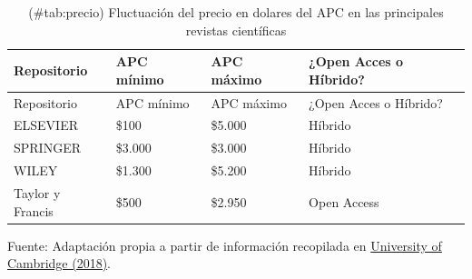 \documentclass[
  spanish,
  letterpaper,
  DIV=11,
  numbers=noendperiod]{scrreprt}
\begin{document}
\begin{longtable}[]{@{}
  >{\raggedright\arraybackslash}p{}
  >{\raggedright\arraybackslash}p{}
  >{\raggedright\arraybackslash}p{}
  >{\raggedright\arraybackslash}p{}@{}}
\caption{(\#tab:precio) Fluctuación del precio en dolares del APC en las
principales revistas científicas}\tabularnewline
\toprule\noalign{}
\begin{minipage}[b]{\linewidth}\raggedright
Repositorio
\end{minipage} & \begin{minipage}[b]{\linewidth}\raggedright
APC mínimo
\end{minipage} & \begin{minipage}[b]{\linewidth}\raggedright
APC máximo
\end{minipage} & \begin{minipage}[b]{\linewidth}\raggedright
¿Open Acces o Híbrido?
\end{minipage} \\
\midrule\noalign{}
\endfirsthead
\toprule\noalign{}
\begin{minipage}[b]{\linewidth}\raggedright
Repositorio
\end{minipage} & \begin{minipage}[b]{\linewidth}\raggedright
APC mínimo
\end{minipage} & \begin{minipage}[b]{\linewidth}\raggedright
APC máximo
\end{minipage} & \begin{minipage}[b]{\linewidth}\raggedright
¿Open Acces o Híbrido?
\end{minipage} \\
\midrule\noalign{}
\endhead
\bottomrule\noalign{}
\endlastfoot
ELSEVIER & \$100 & \$5.000 & Híbrido \\
SPRINGER & \$3.000 & \$3.000 & Híbrido \\
WILEY & \$1.300 & \$5.200 & Híbrido \\
Taylor y Francis & \$500 & \$2.950 & Open Access \\
\end{longtable}

Fuente: Adaptación propia a partir de información recopilada en
\href{https://www.openaccess.cam.ac.uk/publishing-open-access/how-much-do-publishers-charge-open-access}{University
of Cambridge (2018)}.
\end{document}

